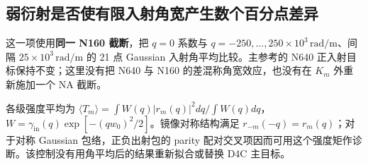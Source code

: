 \documentclass[
  chinese,
  UTF8,
  a4paper,
  11pt]{ctexart}
\begin{document}
\subsection{弱衍射是否使有限入射角宽产生数个百分点差异}\label{ux5f31ux884dux5c04ux662fux5426ux4f7fux6709ux9650ux5165ux5c04ux89d2ux5bbdux4ea7ux751fux6570ux4e2aux767eux5206ux70b9ux5deeux5f02}

这一项使用\textbf{同一 N160 截断}，把 \(q=0\) 系数与
\(q=-250,\ldots,250\times10^3\,\mathrm{rad/m}\)、间隔
\(25\times10^3\,\mathrm{rad/m}\) 的 21 点 Gaussian
入射角平均比较。主参考的 N640 正入射目标保持不变；这里没有把 N640 与
N160 的差混称角宽效应，也没有在 \(K_m\) 外重新施加一个 NA 截断。

各级强度平均为
\(\langle T_m\rangle=\int W(q)|r_m(q)|^2dq/\int W(q)dq\)，\(W=\gamma_{\mathrm{in}}(q)\exp[-(qw_0)^2/2]\)。镜像对称结构满足
\(r_{-m}(-q)=r_m(q)\)；对于对称 Gaussian 包络，正负出射包的 parity
配对交叉项因而可用这个强度矩作诊断。该控制没有用角平均后的结果重新拟合或替换
D4C 主目标。
\end{document}
